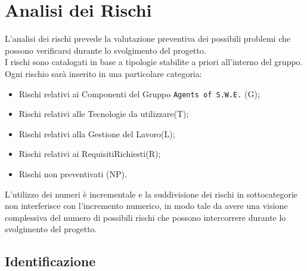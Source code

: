 \section{Analisi dei Rischi}
\label{RischiIntroduzione}

L'analisi dei rischi prevede la valutazione preventiva dei possibili problemi che possono verificarsi durante lo svolgimento del progetto. \\
I rischi sono catalogati in base a tipologie stabilite a priori all'interno del gruppo. 
Ogni rischio sarà inserito in una particolare categoria:
\begin{itemize}
	\item Rischi relativi ai Componenti del Gruppo \texttt{Agents of S.W.E.} (G);
	\item Rischi relativi alle Tecnologie da utilizzare(T);
	\item Rischi relativi alla Gestione del Lavoro(L);
	\item Rischi relativi ai Requisiti\glossario Richiesti(R);
	\item Rischi non preventivati (NP).
\end{itemize}

L'utilizzo dei numeri è incrementale e la suddivisione dei rischi in sottocategorie non interferisce con l'incremento numerico, in modo tale da avere una visione complessiva del numero di possibili rischi che possono intercorrere durante lo svolgimento del progetto. \\

\subsection{Identificazione}
\label{RischiIdentificazione}

